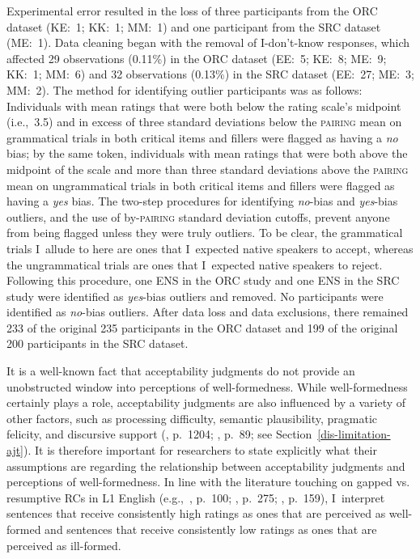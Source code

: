 Experimental error resulted in the loss of three participants from the ORC dataset (KE:~1; KK:~1; MM:~1) and one participant from the SRC dataset (ME:~1). Data cleaning began with the removal of I-don't-know responses, which affected 29 observations (0.11\%) in the ORC dataset (EE:~5; KE:~8; ME:~9; KK:~1; MM:~6) and 32 observations (0.13\%) in the SRC dataset (EE:~27; ME:~3; MM:~2). The method for identifying outlier participants was as follows: Individuals with mean ratings that were both below the rating scale's midpoint (i.e.,~3.5) and in excess of three standard deviations below the \textsc{pairing} mean on grammatical trials in both critical items and fillers were flagged as having a \textit{no} bias; by the same token, individuals with mean ratings that were both above the midpoint of the scale and more than three standard deviations above the \textsc{pairing} mean on ungrammatical trials in both critical items and fillers were flagged as having a \textit{yes} bias. The two-step procedures for identifying \textit{no}-bias and \textit{yes}-bias outliers, and the use of by-\textsc{pairing} standard deviation cutoffs, prevent anyone from being flagged unless they were truly outliers. To be clear, the grammatical trials I~allude to here are ones that I~expected native speakers to accept, whereas the ungrammatical trials are ones that I~expected native speakers to reject. Following this procedure, one ENS in the ORC study and one ENS in the SRC study were identified as \textit{yes}-bias outliers and removed. No participants were identified as \textit{no}-bias outliers. After data loss and data exclusions, there remained 233 of the original 235 participants in the ORC dataset and 199 of the original 200 participants in the SRC dataset.

It is a well-known fact that acceptability judgments do not provide an unobstructed window into perceptions of well-formedness. While well-formedness certainly plays a role, acceptability judgments are also influenced by a variety of other factors, such as processing difficulty, semantic plausibility, pragmatic felicity, and discursive support (\cite{lau.etal2017}, p.~1204; \cite{sprouse.etal2012}, p.~89; see Section~\ref{dis-limitation-ajt}). It is therefore important for researchers to state explicitly what their assumptions are regarding the relationship between acceptability judgments and perceptions of well-formedness. In line with the literature touching on gapped vs. resumptive RCs in L1 English (e.g.,~\cite{chacon2015}, p.~100; \cite{ferreira.swets2005}, p.~275; \cite{han.etal2012}, p.~159), I~interpret sentences that receive consistently high ratings as ones that are perceived as well-formed and sentences that receive consistently low ratings as ones that are perceived as ill-formed.

